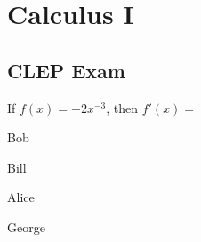 \documentclass[crop=false,class=article,oneside]{standalone}
\begin{document}
    \ifx\ifmathcoursescalculusI\undefined
        \section*{Calculus I}
        \setcounter{section}{1}
    \fi
    \subsection{CLEP Exam}
        \begin{problem}
            If $f(x)=-2x^{-3}$, then $f'(x)=$
            \begin{enumerate}[label=(\Alph*)]
                \begin{multicols}{4}
                    \item Bob
                    \item Bill
                    \item Alice
                    \item George
                \end{multicols}
            \end{enumerate}
        \end{problem}
\end{document}
